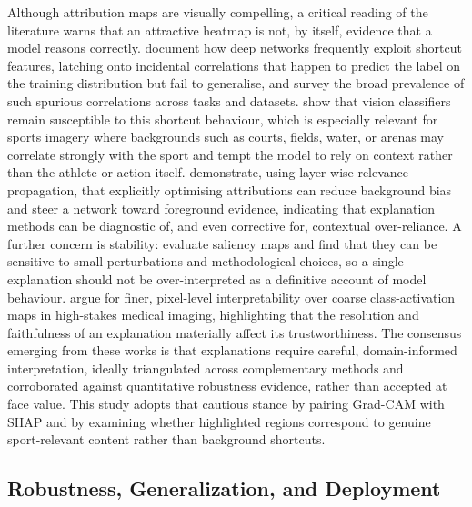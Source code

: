 Although attribution maps are visually compelling, a critical reading of the literature warns that an attractive heatmap is not, by itself, evidence that a model reasons correctly.
\citet{geirhos2020shortcut} document how deep networks frequently exploit shortcut features, latching onto incidental correlations that happen to predict the label on the training distribution but fail to generalise, and \citet{ye2024cleverhans} survey the broad prevalence of such spurious correlations across tasks and datasets.
\citet{suhail2025shortcut} show that vision classifiers remain susceptible to this shortcut behaviour, which is especially relevant for sports imagery where backgrounds such as courts, fields, water, or arenas may correlate strongly with the sport and tempt the model to rely on context rather than the athlete or action itself.
\citet{bassi2024lrp} demonstrate, using layer-wise relevance propagation, that explicitly optimising attributions can reduce background bias and steer a network toward foreground evidence, indicating that explanation methods can be diagnostic of, and even corrective for, contextual over-reliance.
A further concern is stability: \citet{kares2025saliency} evaluate saliency maps and find that they can be sensitive to small perturbations and methodological choices, so a single explanation should not be over-interpreted as a definitive account of model behaviour.
\citet{ennab2025pixel} argue for finer, pixel-level interpretability over coarse class-activation maps in high-stakes medical imaging, highlighting that the resolution and faithfulness of an explanation materially affect its trustworthiness.
The consensus emerging from these works is that explanations require careful, domain-informed interpretation, ideally triangulated across complementary methods and corroborated against quantitative robustness evidence, rather than accepted at face value.
This study adopts that cautious stance by pairing Grad-CAM with SHAP and by examining whether highlighted regions correspond to genuine sport-relevant content rather than background shortcuts.

\subsection{Robustness, Generalization, and Deployment}
\label{subsec:robustdeploy}

